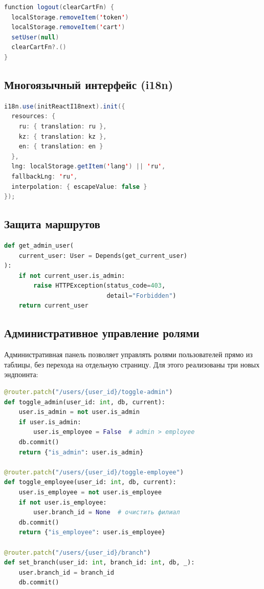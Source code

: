 \documentclass[14pt,a4paper]{extreport}
\begin{document}
\begin{lstlisting}[language=Java, caption={Очистка корзины при logout (AuthContext.jsx)}]
function logout(clearCartFn) {
  localStorage.removeItem('token')
  localStorage.removeItem('cart')
  setUser(null)
  clearCartFn?.()
}
\end{lstlisting}

\subsection{Многоязычный интерфейс (i18n)}

\begin{lstlisting}[language=Java, caption={Конфигурация i18next}]
i18n.use(initReactI18next).init({
  resources: {
    ru: { translation: ru },
    kz: { translation: kz },
    en: { translation: en }
  },
  lng: localStorage.getItem('lang') || 'ru',
  fallbackLng: 'ru',
  interpolation: { escapeValue: false }
});
\end{lstlisting}

\subsection{Защита маршрутов}

\begin{lstlisting}[language=Python, caption={Проверка прав администратора}]
def get_admin_user(
    current_user: User = Depends(get_current_user)
):
    if not current_user.is_admin:
        raise HTTPException(status_code=403,
                            detail="Forbidden")
    return current_user
\end{lstlisting}

\subsection{Административное управление ролями}

Административная панель позволяет управлять ролями пользователей прямо из таблицы, без перехода на отдельную страницу. Для этого реализованы три новых эндпоинта:

\begin{lstlisting}[language=Python, caption={Управление ролями пользователей (admin.py)}]
@router.patch("/users/{user_id}/toggle-admin")
def toggle_admin(user_id: int, db, current):
    user.is_admin = not user.is_admin
    if user.is_admin:
        user.is_employee = False  # admin > employee
    db.commit()
    return {"is_admin": user.is_admin}

@router.patch("/users/{user_id}/toggle-employee")
def toggle_employee(user_id: int, db, current):
    user.is_employee = not user.is_employee
    if not user.is_employee:
        user.branch_id = None  # очистить филиал
    db.commit()
    return {"is_employee": user.is_employee}

@router.patch("/users/{user_id}/branch")
def set_branch(user_id: int, branch_id: int, db, _):
    user.branch_id = branch_id
    db.commit()
\end{lstlisting}
\end{document}
